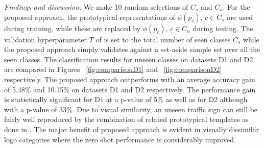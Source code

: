 \documentclass{bmvc2k}
\begin{document}
\textit{Findings and discussion:} We make 10 random selections of $C_s$ and
$C_u$. For the proposed approach, the prototypical
representations of $\phi(p_c),\,c\in C_s$ are used during training, while these are replaced 
by $\phi(p_c),\,c\in C_u$ during testing. The validation
hyperparameter $T$ of \cite{norouzi2013zero} is set to the total
number of seen classes $C_s$ while the proposed approach simply
validates against a set-aside sample set over all the seen classes.
The classification results for unseen classes on datasets D1 and D2 
are compared in Figures ~\ref{fig:comparisonD1} and ~\ref{fig:comparisonD2}
respectively.
The proposed approach outperforms \cite{norouzi2013zero} with an average
accuracy gain of 5.48\% and 10.15\% on datasets D1 and D2 respectively. The
performance gain is statistically significant for D1 at a p-value of 5\% as well
as for D2 although with a p-value of 33\%.
Due to visual similarity, an unseen traffic sign can still be fairly well reproduced by the combination of
related prototypical templates as done in \cite{norouzi2013zero}. The major
benefit of proposed approach is evident in visually dissimilar logo categories
where the zero shot performance is considerably improved.
\end{document}
